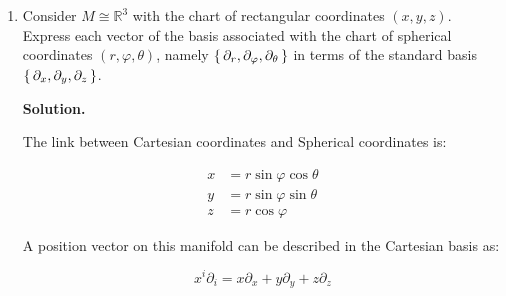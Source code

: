 \documentclass[10pt]{article}
\begin{document}
\begin{enumerate}[start=1,label={\bfseries Exercise \arabic*:},leftmargin=1in]
        \begin{center}
        \end{center}

        



    \bigskip
    \item Consider \(M \cong \mathbb{R}^3\) with the chart of rectangular coordinates \((x,y,z)\). Express each vector of the basis associated with the chart of spherical coordinates \((r, \varphi, \theta)\), namely \(\set{\partial_r, \partial_{\varphi}, \partial_{\theta}}\) in terms of the standard basis \(\set{\partial_x, \partial_y, \partial_z}\).

        \textbf{Solution.}

        The link between Cartesian coordinates and Spherical coordinates is:

        \begin{align*}
            x &= r \sin{\varphi} \cos{\theta} \\
            y &= r \sin{\varphi} \sin{\theta} \\
            z &= r \cos{\varphi}
        \end{align*} 

        A position vector on this manifold can be described in the Cartesian basis as: 

        \begin{equation*}
            x^i \partial_i = x \partial_x + y \partial_y + z \partial_z
        \end{equation*}


\end{enumerate}
\end{document}
